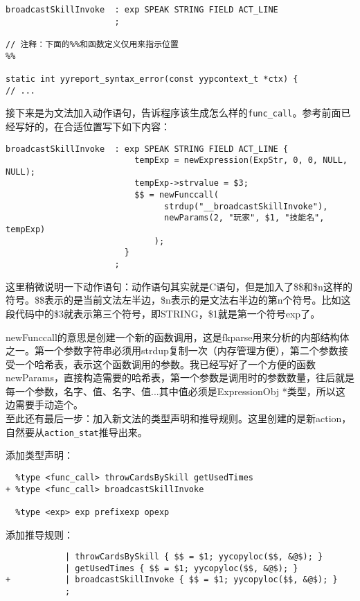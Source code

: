 \begin{verbatim}
broadcastSkillInvoke  : exp SPEAK STRING FIELD ACT_LINE
                      ;

// 注释：下面的%%和函数定义仅用来指示位置
%%

static int yyreport_syntax_error(const yypcontext_t *ctx) {
// ...
\end{verbatim}

接下来是为文法加入动作语句，告诉程序该生成怎么样的\verb|func_call|。参考前面已经写好的，在合适位置写下如下内容：

\begin{verbatim}
broadcastSkillInvoke  : exp SPEAK STRING FIELD ACT_LINE {
                          tempExp = newExpression(ExpStr, 0, 0, NULL, NULL);
                          tempExp->strvalue = $3;
                          $$ = newFunccall(
                                strdup("__broadcastSkillInvoke"),
                                newParams(2, "玩家", $1, "技能名", tempExp)
                              );
                        }
                      ;
\end{verbatim}

这里稍微说明一下动作语句：动作语句其实就是C语句，但是加入了\$\$和\$n这样的符号。\$\$表示的是当前文法左半边，\$n表示的是文法右半边的第n个符号。比如这段代码中的\$3就表示第三个符号，即STRING，\$1就是第一个符号exp了。

newFunccall的意思是创建一个新的函数调用，这是fkparse用来分析的内部结构体之一。第一个参数字符串必须用strdup复制一次（内存管理方便），第二个参数接受一个哈希表，表示这个函数调用的参数。我已经写好了一个方便的函数newParams，直接构造需要的哈希表，第一个参数是调用时的参数数量，往后就是每一个参数，名字、值、名字、值...其中值必须是ExpressionObj *类型，所以这边需要手动造个。\\

至此还有最后一步：加入新文法的类型声明和推导规则。这里创建的是新action，自然要从\verb|action_stat|推导出来。

添加类型声明：

\begin{verbatim}
  %type <func_call> throwCardsBySkill getUsedTimes
+ %type <func_call> broadcastSkillInvoke

  %type <exp> exp prefixexp opexp
\end{verbatim}

添加推导规则：

\begin{verbatim}
            | throwCardsBySkill { $$ = $1; yycopyloc($$, &@$); }
            | getUsedTimes { $$ = $1; yycopyloc($$, &@$); }
+           | broadcastSkillInvoke { $$ = $1; yycopyloc($$, &@$); }
            ;
\end{verbatim}

